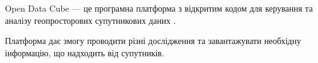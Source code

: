 Open Data Cube --- це програмна платформа з відкритим %
кодом для керування та аналізу
геопросторових супутникових даних \cite{ref6,ref17}.

Платформа дає змогу проводити різні %
дослідження та завантажувати необхідну %
інформацію,
що надходить від супутників.
